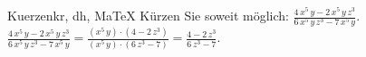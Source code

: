 \begin{MAufgabe}{Kuerzen}{kr, dh, MaTeX}
K\"urzen Sie soweit m\"oglich: $\frac{4\, x^5\, y - 2\, x^5\, y\, z^3}{6\, x^5\, y\, z^3 - 7\, x^5\, y}$.\\ 
\ifLsg\MLoesung
\quad $\frac{4\, x^5\, y - 2\, x^5\, y\, z^3}{6\, x^5\, y\, z^3 - 7\, x^5\, y}=\frac{(x^5\, y)\cdot(4 - 2\, z^3)}{(x^5\, y)\cdot(6\, z^3 - 7)}=\frac{4 - 2\, z^3}{6\, z^3 - 7}$.\else\relax\fi
 \end{MAufgabe}